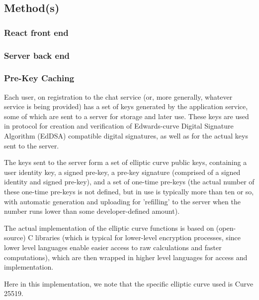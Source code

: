 \documentclass[12pt]{article}
\begin{document}
\newpage
\subsection{Method(s)}
\subsubsection{React front end}


\subsubsection{Server back end}


\subsubsection{Pre-Key Caching}
Each user, on registration to the chat service (or, more generally, whatever service is being provided) has a set of keys generated by the application service, some of which are sent to a server for storage and later use. These keys are used in protocol for creation and verification of Edwards-curve Digital Signature Algorithm (EdDSA) compatible digital signatures, as well as for the actual keys sent to the server. \parencite{website:sigdocXEdDSA} 
\par The keys sent to the server form a set of elliptic curve public keys, containing a user identity key, a signed pre-key, a pre-key signature (comprised of a signed identity and signed pre-key), and a set of one-time pre-keys \parencite{website:sigdocX3DH} (the actual number of these one-time pre-keys is not defined, but in use is typically more than ten or so, with automatic generation and uploading for 'refilling' to the server when the number runs lower than some developer-defined amount).
\par The actual implementation of the elliptic curve functions is based on (open-source) C libraries (which is typical for lower-level encryption processes, since lower level languages enable easier access to raw calculations and faster computations), which are then wrapped in higher level languages for access and implementation. \parencite{website:prglibsigtypescriptCurve25519}\parencite{website:prglibsigtypescriptCurve25519rawC}
\par Here in this implementation, we note that the specific elliptic curve used is Curve 25519.
\end{document}
